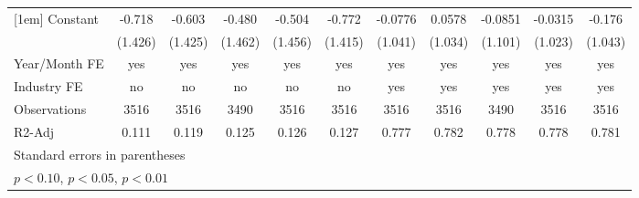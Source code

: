 \begin{table}[htbp]
\begin{tabular}{l*{10}{c}}
[1em]
Constant        &   -0.718         &   -0.603         &   -0.480         &   -0.504         &   -0.772         &  -0.0776         &   0.0578         &  -0.0851         &  -0.0315         &   -0.176         \\
                &  (1.426)         &  (1.425)         &  (1.462)         &  (1.456)         &  (1.415)         &  (1.041)         &  (1.034)         &  (1.101)         &  (1.023)         &  (1.043)         \\
\hline
Year/Month FE   &      yes         &      yes         &      yes         &      yes         &      yes         &      yes         &      yes         &      yes         &      yes         &      yes         \\
Industry FE     &       no         &       no         &       no         &       no         &       no         &      yes         &      yes         &      yes         &      yes         &      yes         \\
Observations    &     3516         &     3516         &     3490         &     3516         &     3516         &     3516         &     3516         &     3490         &     3516         &     3516         \\
R2-Adj          &    0.111         &    0.119         &    0.125         &    0.126         &    0.127         &    0.777         &    0.782         &    0.778         &    0.778         &    0.781         \\
\hline\hline
\multicolumn{11}{l}{\footnotesize Standard errors in parentheses}\\
\multicolumn{11}{l}{\footnotesize \sym{*} \(p<0.10\), \sym{**} \(p<0.05\), \sym{***} \(p<0.01\)}\\
\end{tabular}
\end{table}
